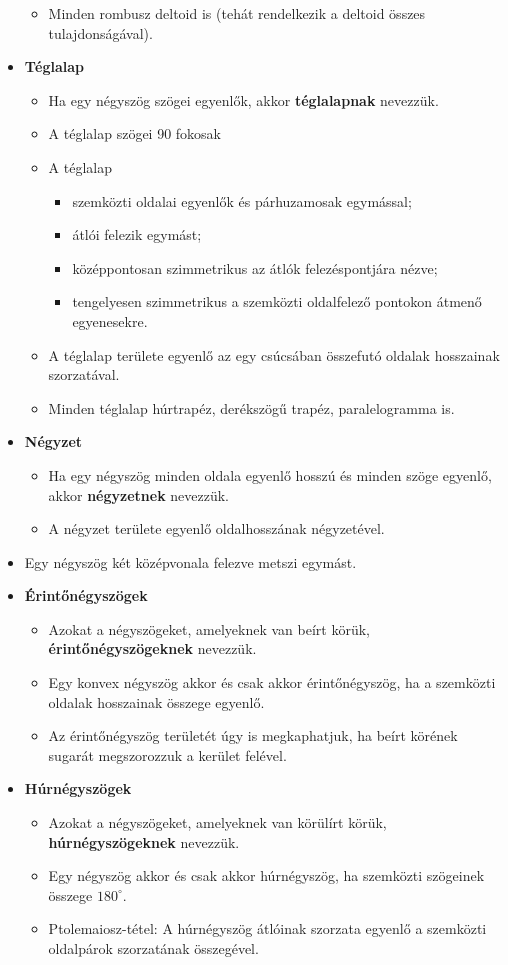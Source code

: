 \documentclass[a4paper,11pt]{article}
\begin{document}
\begin{itemize}
\begin{itemize}[label=$\circ$]
\item Minden rombusz deltoid is (tehát rendelkezik a deltoid összes tulajdonságával).
\end{itemize}
\item \textbf{Téglalap}
\begin{itemize}[label=$\circ$]
\item Ha egy négyszög szögei egyenlők, akkor \textbf{téglalapnak} nevezzük.
\item A téglalap szögei 90 fokosak
\item A téglalap
\begin{itemize}[label=$\cdot$]
\item szemközti oldalai egyenlők és párhuzamosak egymással;
\item átlói felezik egymást;
\item középpontosan szimmetrikus az átlók felezéspontjára nézve;
\item tengelyesen szimmetrikus a szemközti oldalfelező pontokon átmenő egyenesekre.
\end{itemize}
\item A téglalap területe egyenlő az egy csúcsában összefutó oldalak hosszainak szorzatával.
\item Minden téglalap húrtrapéz, derékszögű trapéz, paralelogramma is.
\end{itemize}
\item \textbf{Négyzet}
\begin{itemize}[label=$\circ$]
\item Ha egy négyszög minden oldala egyenlő hosszú és minden szöge egyenlő, akkor \textbf{négyzetnek} nevezzük.
\item A négyzet területe egyenlő oldalhosszának négyzetével.
\end{itemize}
\item Egy négyszög két középvonala felezve metszi egymást.
\item \textbf{Érintőnégyszögek}
\begin{itemize}[label=$\circ$]
\item Azokat a négyszögeket, amelyeknek van beírt körük, \textbf{érintőnégyszögeknek} nevezzük.
\item Egy konvex négyszög akkor és csak akkor érintőnégyszög, ha a szemközti oldalak hosszainak összege egyenlő.
\item Az érintőnégyszög területét úgy is megkaphatjuk, ha beírt körének sugarát megszorozzuk a kerület felével.
\end{itemize}
\item \textbf{Húrnégyszögek}
\begin{itemize}[label=$\circ$]
\item Azokat a négyszögeket, amelyeknek van körülírt körük, \textbf{húrnégyszögeknek} nevezzük.
\item Egy négyszög akkor és csak akkor húrnégyszög, ha szemközti szögeinek összege $180^\circ$.
\item Ptolemaiosz-tétel: A húrnégyszög átlóinak szorzata egyenlő a szemközti oldalpárok szorzatának összegével.
\end{itemize}
\end{itemize}
\end{document}
